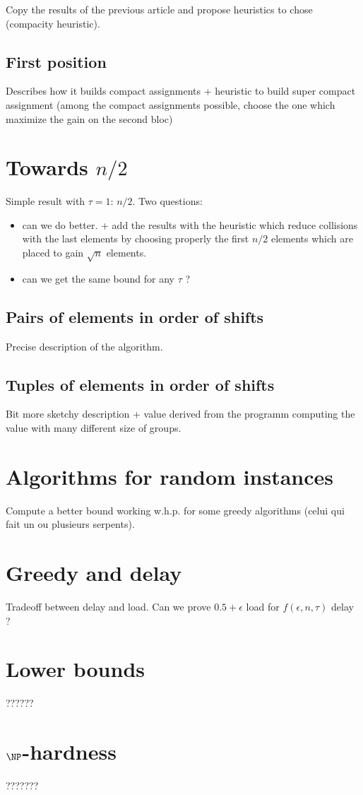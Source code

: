 \documentclass[10pt, conference, letterpaper]{IEEEtran}
\begin{document}
Copy the results of the previous article and propose heuristics to chose (compacity heuristic).

\subsection{First position}

Describes how it builds compact assignments 
+ heuristic to build super compact assignment (among the compact assignments
possible, choose the one which maximize the gain on the second bloc)

\section{Towards $n/2$}

Simple result with $\tau = 1$: $n/2$. 
Two questions:
\begin{itemize}
 \item can we do better.
+ add the results with the heuristic which reduce collisions with the last elements
by choosing properly the first $n/2$ elements which are placed to gain $\sqrt{n}$ elements. 
\item can we get the same bound for any $\tau$ ?
\end{itemize}

\subsection{Pairs of elements in order of shifts}

Precise description of the algorithm. 

\subsection{Tuples of elements in order of shifts}

Bit more sketchy description + value derived from the programm computing the value with many
different size of groups.

\section{Algorithms for random instances}

Compute a better bound working w.h.p. for some greedy algorithms (celui qui fait un ou plusieurs serpents). 

\section{Greedy and delay}

Tradeoff between delay and load. Can we prove $0.5 + \epsilon$ load for $f(\epsilon,n,\tau)$ delay ?


\section{Lower bounds}

??????

\section{$\NP$-hardness}
???????
% 
% 
\end{document}
